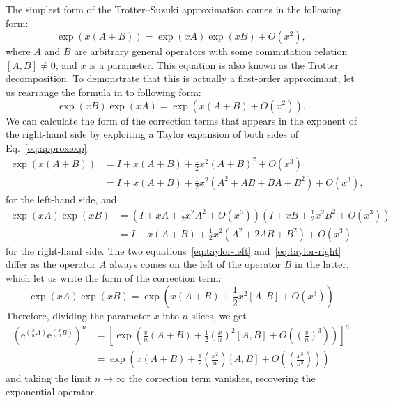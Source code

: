 The simplest form of the Trotter--Suzuki approximation comes in the following form:
\begin{equation} \label{eq:approxexp}
\exp\left({x(A+B)}\right) = \exp\left({xA}\right)\exp\left({xB}\right) + O(x^2), 
\end{equation}
where $A$ and $B$ are arbitrary general operators with some commutation relation $[A,B] \neq 0$, and $x$ is a parameter. This equation is also known as the Trotter decomposition. To demonstrate that this is actually a first-order approximant, let us rearrange the formula in to following form:
\begin{equation}
\exp\left({xB}\right)\exp\left({xA}\right) = \exp\left({x(A+B) + O(x^2)}\right).
\end{equation}
We can calculate the form of the correction terms that appears in the exponent of the right-hand side by exploiting a Taylor expansion of both sides of Eq.~\eqref{eq:approxexp}.
\begin{align}  \label{eq:taylor-left}
\exp\left({x(A+B)}\right) &= I + x(A+B) + \frac{1}{2} x^2 (A+B)^2 + O(x^3) \\
& = I + x(A+B) + \frac{1}{2} x^2 (A^2 + AB + BA + B^2) + O(x^3) , \nonumber
\end{align}
for the left-hand side, and
\begin{align} \label{eq:taylor-right}
\exp\left({xA}\right) \exp\left( {xB}\right) &= (I + xA + \frac{1}{2} x^2 A^2 + O(x^3)) (I + xB + \frac{1}{2} x^2 B^2 + O(x^3)) \nonumber \\
& = I + x(A+B) + \frac{1}{2} x^2 (A^2 + 2AB + B^2) + O(x^3) 
\end{align}
for the right-hand side. The two equations~\eqref{eq:taylor-left} and~\eqref{eq:taylor-right} differ as the operator $A$ always comes on the left of the operator $B$ in the latter, which let us write the form of the correction term:
\begin{equation}
\exp\left({xA}\right) \exp\left({xB}\right) = \exp\left({x(A+B) + \frac{1}{2} x^2 [A,B] + O(x^3)}\right)
\end{equation}
Therefore, dividing the parameter $x$ into $n$ slices, we get
\begin{align}
\left( \mathrm{e}^{ \left({\frac{x}{n}A}\right)} \mathrm{e}^{ \left({\frac{x}{n}B}\right)} \right)^n &= \left[ \exp\left({\frac{x}{n}(A + B) + \frac{1}{2}\left(\frac{x}{n}\right)^2 [A,B] + O\left(\left(\frac{x}{n}\right)^3\right)}\right) \right]^n \nonumber \\ 
&= \exp\left({x(A+B) + \frac{1}{2}\left(\frac{x^2}{n}\right) [A,B] + O\left(\left(\frac{x^3}{n^2}\right)\right)}\right) \nonumber
\end{align}
and taking the limit $n \rightarrow \infty$ the correction term vanishes, recovering the exponential operator.

